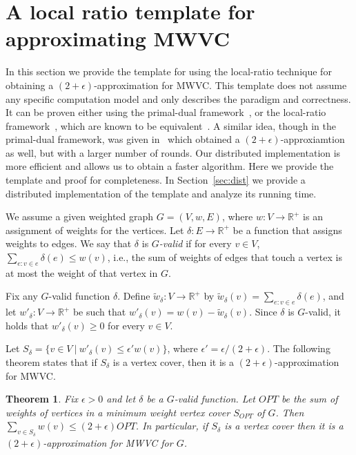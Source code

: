 \documentclass[11pt]{article}
\newtheorem{theorem}{Theorem}[section]
\begin{document}
\section{A local ratio template for approximating MWVC}
\label{sec:LR}
In this section we provide the template for using the local-ratio technique for obtaining a $(2+\epsilon)$-approximation for MWVC. This template does not assume any specific computation model and only describes the paradigm and correctness. It can be proven either using the primal-dual framework~\cite{BarYehudaE81}, or the local-ratio framework~\cite{BarYehuda00}, which are known to be equivalent~\cite{BarYehudaR05}. A similar idea, though in the primal-dual framework, was given in~\cite{KhullerVY94} which obtained a $(2+\epsilon)$-approxiamtion as well, but with a larger number of rounds. Our distributed implementation is more efficient and allows us to obtain a faster algorithm.
Here we provide the template and proof for completeness. In Section~\ref{sec:dist} we provide a distributed implementation of the template and analyze its running time.

We assume a given weighted graph $G=(V,w,E)$, where $w: V \rightarrow \mathbb{R}^{+}$ is an assignment of weights for the vertices.
Let $\delta: E \rightarrow \mathbb{R}^{+}$ be a function that assigns weights to edges. We say that $\delta$ is \emph{$G$-valid} if for every $v \in V$, $\sum_{e: v \in e}{\delta(e)} \leq w(v)$, i.e., the sum of weights of edges that touch a vertex is at most the weight of that vertex in $G$.

Fix any $G$-valid function $\delta$. Define $\tilde{w}_{\delta}: V \rightarrow \mathbb{R}^{+}$ by $\tilde{w}_{\delta}(v) = \sum_{e: v \in e}{\delta(e)}$, and let $w'_{\delta}: V \rightarrow \mathbb{R}^{+}$ be such that $w'_{\delta}(v)=w(v)-\tilde{w}_{\delta}(v)$. Since $\delta$ is $G$-valid, it holds that $w'_{\delta}(v) \geq 0$ for every $v \in V$.

Let $S_{\delta}=\{v \in V ~|~ w'_{\delta}(v) \leq \epsilon' w(v) \}$, where $\epsilon'= \epsilon/(2+\epsilon)$. The following theorem states that if $S_{\delta}$ is a vertex cover, then it is a $(2+\epsilon)$-approximation for MWVC.
\begin{theorem}
\label{thm:lr}
Fix $\epsilon>0$ and let $\delta$ be a $G$-valid function. Let $OPT$ be the sum of weights of vertices in a minimum weight vertex cover $S_{OPT}$ of $G$. Then $\sum_{v \in S_{\delta}}{w(v)} \leq (2+\epsilon)OPT$. In particular, if $S_{\delta}$ is a vertex cover then it is a $(2+\epsilon)$-approximation for MWVC for $G$.
\end{theorem}
\end{document}
